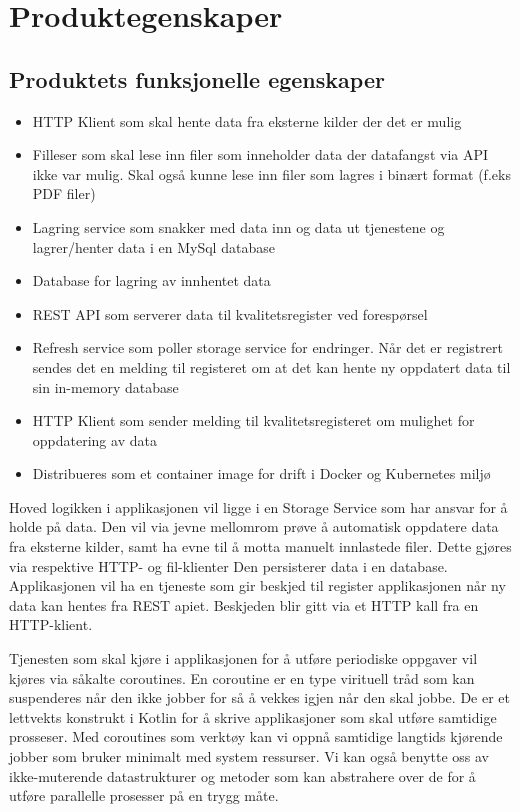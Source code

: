 \section{Produktegenskaper}

\subsection{Produktets funksjonelle egenskaper} 

\begin{itemize}
    \item HTTP Klient som skal hente data fra eksterne kilder der det er mulig
    \item Filleser som skal lese inn filer som inneholder data der datafangst via API ikke var mulig. Skal også kunne lese inn filer som lagres i binært format (f.eks PDF filer)
    \item Lagring service som snakker med data inn og data ut tjenestene og lagrer/henter data i en MySql database 
    \item Database for lagring av innhentet data
    \item REST API som serverer data til kvalitetsregister ved forespørsel
    \item Refresh service som poller storage service for endringer. Når det er registrert sendes det en melding til registeret om at det kan hente ny oppdatert data til sin in-memory database
    \item HTTP Klient som sender melding til kvalitetsregisteret om mulighet for oppdatering av data
    \item Distribueres som et container image for drift i Docker og Kubernetes miljø    
\end{itemize} 

Hoved logikken i applikasjonen vil ligge i en Storage Service som har ansvar for å holde på data. Den vil via jevne mellomrom prøve å automatisk oppdatere data fra eksterne kilder, samt ha evne til å motta manuelt innlastede filer. Dette gjøres via respektive HTTP- og fil-klienter Den persisterer data i en database. Applikasjonen vil ha en tjeneste som gir beskjed til register applikasjonen når ny data kan hentes fra REST apiet. Beskjeden blir gitt via et HTTP kall fra en HTTP-klient.

Tjenesten som skal kjøre i applikasjonen for å utføre periodiske oppgaver vil kjøres via såkalte coroutines. En coroutine er en type virituell tråd som kan suspenderes når den ikke jobber for så å vekkes igjen når den skal jobbe. De er et lettvekts konstrukt i Kotlin for å skrive applikasjoner som skal utføre samtidige prosseser. Med coroutines som verktøy kan vi oppnå samtidige langtids kjørende jobber som bruker minimalt med system ressurser.\cite{4-coroutines} Vi kan også benytte oss av ikke-muterende datastrukturer og metoder som kan abstrahere over de for å utføre parallelle prosesser på en trygg måte.

